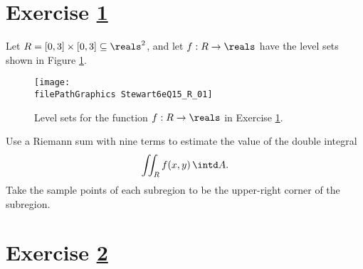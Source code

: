 %
%
%
%

\section{Exercise \ref{sec: Math212 2016 Fall HalfExam02Q01}}
\label{sec: Math212 2016 Fall HalfExam02Q01}

Let $R = [0,3] \times [0,3] \subseteq \reals^{2}$, and let $f: R \rightarrow \reals$ have the level sets shown in Figure \ref{fig: Stewart6eQ15.R.01}.
\begin{figure}[t]
\centering
\texttt{[image: \\filePathGraphics Stewart6eQ15\_R\_01]}
\caption{Level sets for the function $f: R \rightarrow \reals$ in Exercise \ref{sec: Math212 2016 Fall HalfExam02Q01}.}
\label{fig: Stewart6eQ15.R.01}
\end{figure}
Use a Riemann sum with nine terms to estimate the value of the double integral
\begin{align*}
\iint_{R} f(x,y) \, \intd A.
\end{align*}
Take the sample points of each subregion to be the upper-right corner of the subregion.






%
%
%
%

\section{Exercise \ref{sec: Math212 2016 Fall HalfExam02Q02}}
\label{sec: Math212 2016 Fall HalfExam02Q02}

